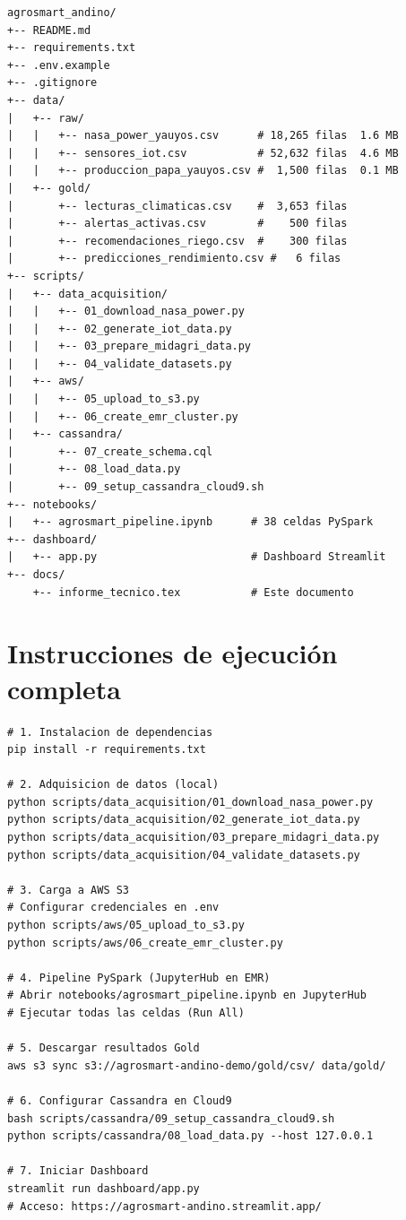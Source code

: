 \documentclass[12pt,a4paper]{article}
\begin{document}
\begin{lstlisting}[style=bashstyle, caption={Árbol de archivos del proyecto}]
agrosmart_andino/
+-- README.md
+-- requirements.txt
+-- .env.example
+-- .gitignore
+-- data/
|   +-- raw/
|   |   +-- nasa_power_yauyos.csv      # 18,265 filas  1.6 MB
|   |   +-- sensores_iot.csv           # 52,632 filas  4.6 MB
|   |   +-- produccion_papa_yauyos.csv #  1,500 filas  0.1 MB
|   +-- gold/
|       +-- lecturas_climaticas.csv    #  3,653 filas
|       +-- alertas_activas.csv        #    500 filas
|       +-- recomendaciones_riego.csv  #    300 filas
|       +-- predicciones_rendimiento.csv #   6 filas
+-- scripts/
|   +-- data_acquisition/
|   |   +-- 01_download_nasa_power.py
|   |   +-- 02_generate_iot_data.py
|   |   +-- 03_prepare_midagri_data.py
|   |   +-- 04_validate_datasets.py
|   +-- aws/
|   |   +-- 05_upload_to_s3.py
|   |   +-- 06_create_emr_cluster.py
|   +-- cassandra/
|       +-- 07_create_schema.cql
|       +-- 08_load_data.py
|       +-- 09_setup_cassandra_cloud9.sh
+-- notebooks/
|   +-- agrosmart_pipeline.ipynb      # 38 celdas PySpark
+-- dashboard/
|   +-- app.py                        # Dashboard Streamlit
+-- docs/
    +-- informe_tecnico.tex           # Este documento
\end{lstlisting}

\section{Instrucciones de ejecución completa}

\begin{lstlisting}[style=bashstyle, caption={Flujo de ejecución paso a paso}]
# 1. Instalacion de dependencias
pip install -r requirements.txt

# 2. Adquisicion de datos (local)
python scripts/data_acquisition/01_download_nasa_power.py
python scripts/data_acquisition/02_generate_iot_data.py
python scripts/data_acquisition/03_prepare_midagri_data.py
python scripts/data_acquisition/04_validate_datasets.py

# 3. Carga a AWS S3
# Configurar credenciales en .env
python scripts/aws/05_upload_to_s3.py
python scripts/aws/06_create_emr_cluster.py

# 4. Pipeline PySpark (JupyterHub en EMR)
# Abrir notebooks/agrosmart_pipeline.ipynb en JupyterHub
# Ejecutar todas las celdas (Run All)

# 5. Descargar resultados Gold
aws s3 sync s3://agrosmart-andino-demo/gold/csv/ data/gold/

# 6. Configurar Cassandra en Cloud9
bash scripts/cassandra/09_setup_cassandra_cloud9.sh
python scripts/cassandra/08_load_data.py --host 127.0.0.1

# 7. Iniciar Dashboard
streamlit run dashboard/app.py
# Acceso: https://agrosmart-andino.streamlit.app/
\end{lstlisting}
\end{document}
